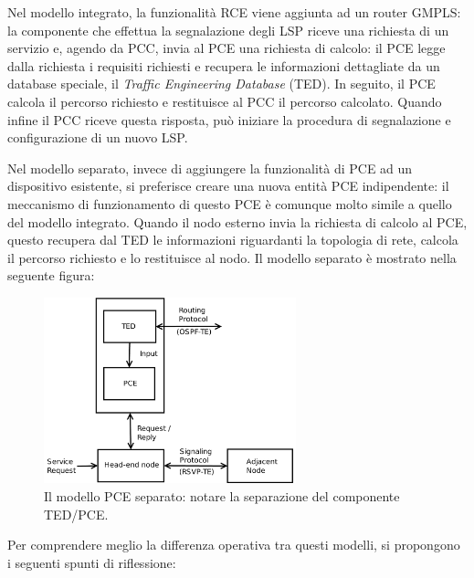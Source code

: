 \documentclass[10pt,a4paper]{report}
\begin{document}
\newpage

Nel modello integrato, la funzionalità RCE viene aggiunta ad un router
GMPLS: la componente che effettua la segnalazione degli LSP riceve una
richiesta di un servizio e, agendo da PCC, invia al PCE una richiesta
di calcolo: il PCE legge dalla richiesta i requisiti richiesti e
recupera le informazioni dettagliate da un database speciale, il
\textit{Traffic Engineering Database} (TED). In seguito, il PCE
calcola il percorso richiesto e restituisce al PCC il percorso
calcolato. Quando infine il PCC riceve questa risposta, può iniziare
la procedura di segnalazione e configurazione di un nuovo LSP.

Nel modello separato, invece di aggiungere la funzionalità di PCE ad
un dispositivo esistente, si preferisce creare una nuova entità PCE
indipendente: il meccanismo di funzionamento di questo PCE è comunque
molto simile a quello del modello integrato. Quando il nodo esterno
invia la richiesta di calcolo al PCE, questo recupera dal TED le
informazioni riguardanti la topologia di rete, calcola il percorso
richiesto e lo restituisce al nodo. Il modello separato è mostrato
nella seguente figura:

\begin{figure}[!htbp]
  \centering
  \includegraphics[width=0.65\textwidth]{img/pce_external}
  \caption[]{Il modello PCE separato: notare la separazione del
    componente TED/PCE.}
\end{figure}

Per comprendere meglio la differenza operativa tra questi modelli, si
propongono i seguenti spunti di riflessione:
\end{document}
